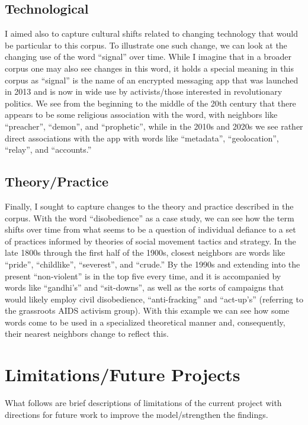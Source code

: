 \documentclass[11pt]{article}
\begin{document}
\subsection{Technological}

I aimed also to capture cultural shifts related to changing technology that would be particular to this corpus. To illustrate one such change, we can look at the changing use of the word “signal” over time. While I imagine that in a broader corpus one may also see changes in this word, it holds a special meaning in this corpus as “signal” is the name of an encrypted messaging app that was launched in 2013 and is now in wide use by activists/those interested in revolutionary politics. We see from the beginning to the middle of the 20th century that there appears to be some religious association with the word, with neighbors like “preacher”, “demon”, and “prophetic”, while in the 2010s and 2020s we see rather direct associations with the app with words like “metadata”, “geolocation”, “relay”, and “accounts.”

\subsection{Theory/Practice}

Finally, I sought to capture changes to the theory and practice described in the corpus. With the word “disobedience” as a case study, we can see how the term shifts over time from what seems to be a question of individual defiance to a set of practices informed by theories of social movement tactics and strategy. In the late 1800s through the first half of the 1900s, closest neighbors are words like “pride”, “childlike”, “severest”, and “crude.” By the 1990s and extending into the present “non-violent” is in the top five every time, and it is accompanied by words like “gandhi’s” and “sit-downs”, as well as the sorts of campaigns that would likely employ civil disobedience, “anti-fracking” and “act-up’s” (referring to the grassroots AIDS activism group). With this example we can see how some words come to be used in a specialized theoretical manner and, consequently, their nearest neighbors change to reflect this. 

\section*{Limitations/Future Projects}
What follows are brief descriptions of limitations of the current project with directions for future work to improve the model/strengthen the findings.
\end{document}
